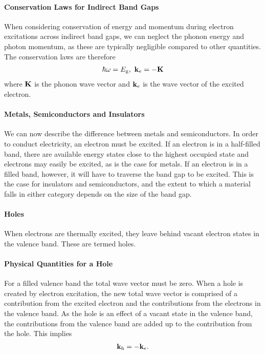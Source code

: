 \paragraph{Conservation Laws for Indirect Band Gaps}
When considering conservation of energy and momentum during electron excitations across indirect band gaps, we can neglect the phonon energy and photon momentum, as these are typically negligible compared to other quantities. The conservation laws are therefore
\begin{align*}
	\hbar\omega = E_{\text{g}},\ \vb{k}_{e} = -\vb{K}
\end{align*}
where $\vb{K}$ is the phonon wave vector and $\vb{k}_{e}$ is the wave vector of the excited electron.

\paragraph{Metals, Semiconductors and Insulators}
We can now describe the difference between metals and semiconductors. In order to conduct electricity, an electron must be excited. If an electron is in a half-filled band, there are available energy states close to the highest occupied state and electrons may easily be excited, as is the case for metals. If an electron is in a filled band, however, it will have to traverse the band gap to be excited. This is the case for insulators and semiconductors, and the extent to which a material falls in either category depends on the size of the band gap.

\paragraph{Holes}
When electrons are thermally excited, they leave behind vacant electron states in the valence band. These are termed holes.

\paragraph{Physical Quantities for a Hole}
For a filled valence band the total wave vector must be zero. When a hole is created by electron excitation, the new total wave vector is comprised of a contribution from the excited electron and the contributions from the electrons in the valence band. As the hole is an effect of a vacant state in the valence band, the contributions from the valence band are added up to the contribution from the hole. This implies
\begin{align*}
	\vb{k}_{\text{h}} = -\vb{k}_{e}.
\end{align*}

